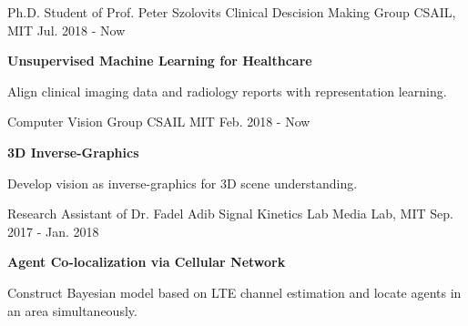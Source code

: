 \documentclass[12pt, a4paper]{awesome-cv}
\begin{document}
\begin{cventries}
    \cventry
    {Ph.D. Student of Prof. Peter Szolovits}
    {Clinical Descision Making Group}
    {CSAIL, MIT}
    {Jul. 2018 - Now}
    {
        \begin{cvitems}
        \item{\bfseries Unsupervised Machine Learning for Healthcare}
            \begin{cvitems}
                \item{Align clinical imaging data and radiology reports with representation learning.}
            \end{cvitems}
        \end{cvitems} 
    }
    \vspace{-5mm}

    \cventry
    {}
    {Computer Vision Group}
    {CSAIL MIT}
    {Feb. 2018 - Now}
    {
        \begin{cvitems}
        \item{\bfseries 3D Inverse-Graphics}
            \begin{cvitems}
                \item{Develop vision as inverse-graphics for 3D scene understanding.}
            \end{cvitems}
        \end{cvitems} 
    }
    \vspace{-5mm}

    \cventry
    {Research Assistant of Dr. Fadel Adib}
    {Signal Kinetics Lab}
    {Media Lab, MIT}
    {Sep. 2017 - Jan. 2018}
    {
        \begin{cvitems}
        \item{\bfseries Agent Co-localization via Cellular Network}
            \begin{cvitems}
                \item{Construct Bayesian model based on LTE channel estimation and locate agents in an area simultaneously.}
            \end{cvitems}
        \end{cvitems} 
    }
    \vspace{-5mm}


\end{cventries}
\end{document}
